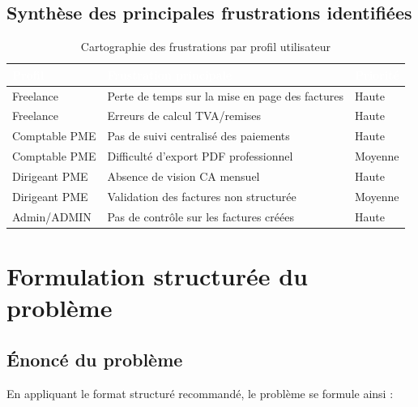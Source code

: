 \documentclass[12pt,a4paper]{report}
\begin{document}
\subsection{Synthèse des principales frustrations identifiées}

\begin{table}[H]
\centering
\caption{Cartographie des frustrations par profil utilisateur}
\label{tab:frustrations}
\begin{tabularx}{\textwidth}{|l|X|l|}
\hline
\rowcolor{emsiblue}\textcolor{white}{\textbf{Profil}} & \textcolor{white}{\textbf{Frustration principale}} & \textcolor{white}{\textbf{Priorité}} \\
\hline
Freelance & Perte de temps sur la mise en page des factures & Haute \\
Freelance & Erreurs de calcul TVA/remises & Haute \\
Comptable PME & Pas de suivi centralisé des paiements & Haute \\
Comptable PME & Difficulté d'export PDF professionnel & Moyenne \\
Dirigeant PME & Absence de vision CA mensuel & Haute \\
Dirigeant PME & Validation des factures non structurée & Moyenne \\
Admin/ADMIN & Pas de contrôle sur les factures créées & Haute \\
\hline
\end{tabularx}
\end{table}

\section{Formulation structurée du problème}

\subsection{Énoncé du problème}

En appliquant le format structuré recommandé, le problème se formule ainsi :

\begin{center}
\end{center}
\end{document}
